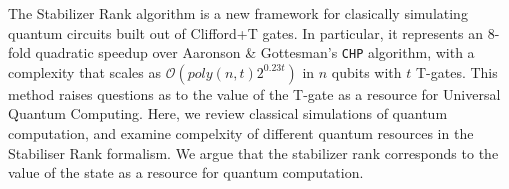 \documentclass{standalone}
\begin{document}
The Stabilizer Rank algorithm is a new framework for clasically simulating quantum circuits built out of Clifford+T gates. In particular, it represents an 8-fold quadratic speedup over Aaronson \& Gottesman's \texttt{CHP} algorithm, with a complexity that scales as $\mathcal{O}(poly(n,t)2^{0.23 t})$ in $n$ qubits with $t$ T-gates. This method raises questions as to the value of the T-gate as a resource for Universal Quantum Computing. Here, we review classical simulations of quantum computation, and examine compelxity of different quantum resources in the Stabiliser Rank formalism. We argue that the stabilizer rank corresponds to the value of the state as a resource for quantum computation. 

\ifstandalone

\fi
\end{document}

